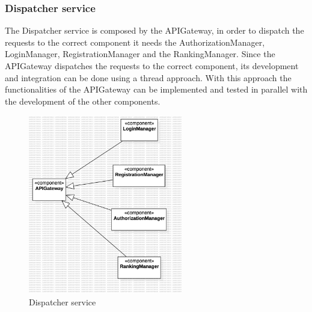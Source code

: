 \subsubsection*{Dispatcher service}
The Dispatcher service is composed by the APIGateway, in order to dispatch the requests to the correct component it needs the AuthorizationManager, LoginManager, RegistrationManager and the RankingManager.
Since the APIGateway dispatches the requests to the correct component, its development and integration can be done using a thread approach. With this approach the functionalities of the APIGateway can be implemented and tested in parallel with the development of the other components.
\begin{figure}[H]
    \centering
    \includegraphics[width=0.6\textwidth]{Diagrams/DispatcherIntegrationPlan.jpg}
    \caption{Dispatcher service}
    \label{fig:dispatcher}
\end{figure}

